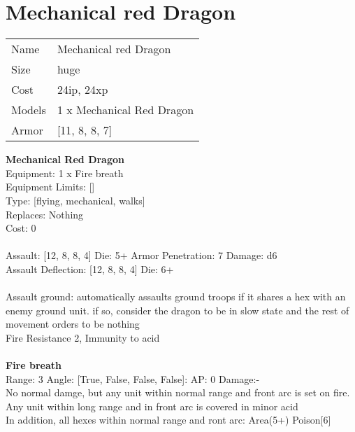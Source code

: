 \pagebreak

\section{ Mechanical red Dragon }

\begin{tabular}{ll}
  Name & Mechanical red Dragon \\
  Size & huge\\
  Cost & 24ip, 24xp\\
  Models & 1 x Mechanical Red Dragon\\
  Armor & [11, 8, 8, 7]\\
\end{tabular}

\noindent 

{\bf Mechanical Red Dragon } \\
Equipment: 1 x Fire breath \\
Equipment Limits: [] \\
Type: [flying, mechanical, walks] \\
Replaces: Nothing \\
Cost: 0\\
\ \\
Assault: [12, 8, 8, 4] Die: 5+ Armor Penetration: 7 Damage: d6 \\
Assault Deflection: [12, 8, 8, 4] Die: 6+\\
\indent  
\ \\
Assault ground: automatically assaults ground troops if it shares a hex with an enemy ground unit. if so, consider the dragon to be in slow state and the rest of movement orders to be nothing\\ 
Fire Resistance 2, Immunity to acid\\ 

\ \\
{\bf Fire breath } \\



Range: 3  Angle: [True, False, False, False]: AP: 0 Damage:- \\
No normal damge, but any unit within normal range and front arc is set on fire. Any unit within long range and in front arc is covered in minor acid\\ 
In addition, all hexes within normal range and ront arc: Area(5+) Poison[6]\\ 




 
\ \\




